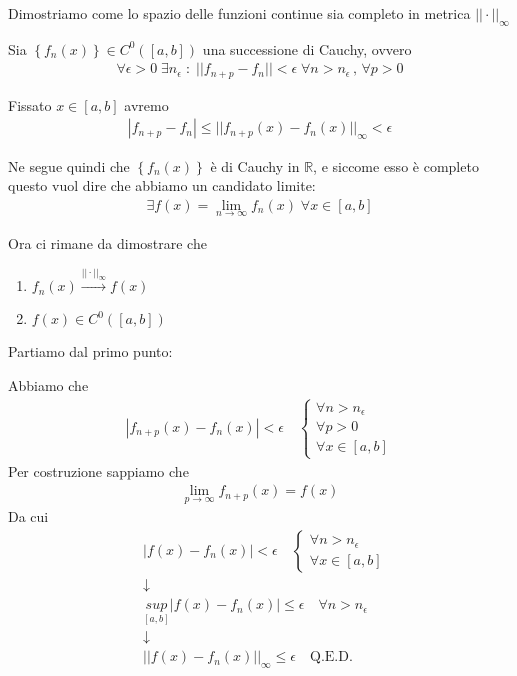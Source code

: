 Dimostriamo come lo spazio delle funzioni continue sia completo in metrica $||\cdot||_\infty$

\bigskip


Sia $\left\{f_n(x)\right\} \in C^0([a,b])$ una successione di Cauchy, ovvero
\begin{align}
\forall \epsilon > 0 \; \exists n_\epsilon \; : \; ||f_{n+p} - f_n||< \epsilon \; \forall n>n_\epsilon \, , \, \forall p>0
\end{align}

Fissato $x\in [a,b]$ avremo
\begin{align}
|f_{n+p} - f_n| \leq || f_{n+p}(x) - f_n(x)||_\infty<\epsilon
\end{align}

Ne segue quindi che $\left\{f_n(x)\right\}$ è di Cauchy in $\mathbb{R}$, e siccome esso è completo questo vuol dire che abbiamo un candidato limite:
\begin{align}
\exists f(x)= \underset{n \rightarrow \infty}{\lim}f_n(x) \; \forall x\in [a,b]
\end{align}

\newpage

Ora ci rimane da dimostrare che

\begin{enumerate}
	\item $f_n(x) \overset{||\cdot||_\infty}{\longrightarrow} f(x)$
	\item $f(x)  \in C^0([a,b])$
\end{enumerate}

Partiamo dal primo punto:

Abbiamo che
\begin{align}
|f_{n+p}(x) - f_n(x)|< \epsilon \quad \left\{
\begin{array}{ccc}
{}\forall n>n_\epsilon \\
\forall p>0 \\
\forall x \in [a,b]
\end{array}
\right.
\end{align}
Per costruzione sappiamo che
\begin{align}
\underset{p\rightarrow \infty}{\lim}f_{n+p}(x) = f(x)
\end{align}
Da cui
\begin{align}
{}&|f(x) - f_n(x)|< \epsilon \quad \left\{
\begin{array}{cc}
{}\forall n>n_\epsilon \\
\forall x \in [a,b]
\end{array}
\right. \\
&\downarrow \nonumber\\
&\underset{[a,b]}{sup}|f(x) - f_n(x)| \leq \epsilon \quad \forall n> n_\epsilon \\
&\downarrow \nonumber\\
& ||f(x) - f_n(x)||_\infty \leq \epsilon \quad \text{Q.E.D.}
\end{align}

